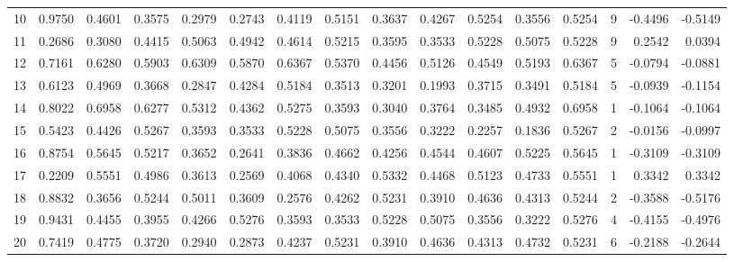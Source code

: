 \begin{tabular}{lrrrrrrrrrrrrrrr}
10  &      0.9750 &  0.4601 &  0.3575 &  0.2979 &  0.2743 &  0.4119 &  0.5151 &  0.3637 &  0.4267 &  0.5254 &   0.3556 &     0.5254 &      9 &                   -0.4496 &                    -0.5149 \\
11  &      0.2686 &  0.3080 &  0.4415 &  0.5063 &  0.4942 &  0.4614 &  0.5215 &  0.3595 &  0.3533 &  0.5228 &   0.5075 &     0.5228 &      9 &                    0.2542 &                     0.0394 \\
12  &      0.7161 &  0.6280 &  0.5903 &  0.6309 &  0.5870 &  0.6367 &  0.5370 &  0.4456 &  0.5126 &  0.4549 &   0.5193 &     0.6367 &      5 &                   -0.0794 &                    -0.0881 \\
13  &      0.6123 &  0.4969 &  0.3668 &  0.2847 &  0.4284 &  0.5184 &  0.3513 &  0.3201 &  0.1993 &  0.3715 &   0.3491 &     0.5184 &      5 &                   -0.0939 &                    -0.1154 \\
14  &      0.8022 &  0.6958 &  0.6277 &  0.5312 &  0.4362 &  0.5275 &  0.3593 &  0.3040 &  0.3764 &  0.3485 &   0.4932 &     0.6958 &      1 &                   -0.1064 &                    -0.1064 \\
15  &      0.5423 &  0.4426 &  0.5267 &  0.3593 &  0.3533 &  0.5228 &  0.5075 &  0.3556 &  0.3222 &  0.2257 &   0.1836 &     0.5267 &      2 &                   -0.0156 &                    -0.0997 \\
16  &      0.8754 &  0.5645 &  0.5217 &  0.3652 &  0.2641 &  0.3836 &  0.4662 &  0.4256 &  0.4544 &  0.4607 &   0.5225 &     0.5645 &      1 &                   -0.3109 &                    -0.3109 \\
17  &      0.2209 &  0.5551 &  0.4986 &  0.3613 &  0.2569 &  0.4068 &  0.4340 &  0.5332 &  0.4468 &  0.5123 &   0.4733 &     0.5551 &      1 &                    0.3342 &                     0.3342 \\
18  &      0.8832 &  0.3656 &  0.5244 &  0.5011 &  0.3609 &  0.2576 &  0.4262 &  0.5231 &  0.3910 &  0.4636 &   0.4313 &     0.5244 &      2 &                   -0.3588 &                    -0.5176 \\
19  &      0.9431 &  0.4455 &  0.3955 &  0.4266 &  0.5276 &  0.3593 &  0.3533 &  0.5228 &  0.5075 &  0.3556 &   0.3222 &     0.5276 &      4 &                   -0.4155 &                    -0.4976 \\
20  &      0.7419 &  0.4775 &  0.3720 &  0.2940 &  0.2873 &  0.4237 &  0.5231 &  0.3910 &  0.4636 &  0.4313 &   0.4732 &     0.5231 &      6 &                   -0.2188 &                    -0.2644 \\

\end{tabular}
